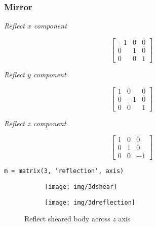 \documentclass{scrartcl}
\begin{document}
\subsubsection*{Mirror}
\noindent
\begin{center}
	\begin{minipage}{.3\linewidth}
		\begin{center}
			\textit{Reflect $x$ component}
		\end{center}
		$$\left[ \begin{smallmatrix} 
		-1 & 0 & 0\\
		0 & 1 & 0\\
		0 & 0 & 1
		\end{smallmatrix} \right]$$
	\end{minipage}%
	\begin{minipage}{.3\linewidth}
		\begin{center}
			\textit{Reflect $y$ component}
		\end{center}
		$$\left[ \begin{smallmatrix} 
		1 & 0 & 0\\
		0 & -1 & 0\\
		0 & 0 & 1
		\end{smallmatrix} \right]$$
	\end{minipage}
	\begin{minipage}{.3\linewidth}
		\begin{center}
			\textit{Reflect $z$ component}
		\end{center}
		$$\left[ \begin{smallmatrix}
		1 & 0 & 0\\
		0 & 1 & 0\\
		0 & 0 & -1
		\end{smallmatrix} \right]$$
	\end{minipage}
\end{center}
\begin{center}
	\texttt{m = matrix(3, 'reflection', axis)}
\end{center}
\begin{figure}[H]
	\centering
	\begin{subfigure}{.41\textwidth}
		\centering
		\texttt{[image: img/3dshear]}
	\end{subfigure}%
	\begin{subfigure}{.41\textwidth}
		\centering
		\texttt{[image: img/3dreflection]}
	\end{subfigure}
	\caption{Reflect sheared body across $z$ axis}
	\label{fig:rot}
\end{figure}
\end{document}
